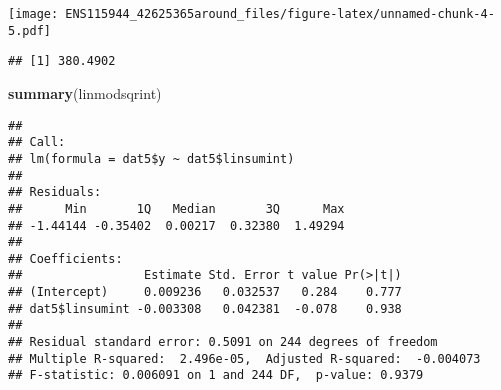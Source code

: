 \documentclass[
]{article}
\newenvironment{Shaded}{\begin{snugshade}}{\end{snugshade}}
\newcommand{\CommentTok}[1]{\textcolor[rgb]{0.56,0.35,0.01}{\textit{#1}}}
\newcommand{\DecValTok}[1]{\textcolor[rgb]{0.00,0.00,0.81}{#1}}
\newcommand{\FloatTok}[1]{\textcolor[rgb]{0.00,0.00,0.81}{#1}}
\newcommand{\KeywordTok}[1]{\textcolor[rgb]{0.13,0.29,0.53}{\textbf{#1}}}
\newcommand{\NormalTok}[1]{#1}
\newcommand{\OperatorTok}[1]{\textcolor[rgb]{0.81,0.36,0.00}{\textbf{#1}}}
\newcommand{\StringTok}[1]{\textcolor[rgb]{0.31,0.60,0.02}{#1}}
\begin{document}
\begin{Shaded}
\end{Shaded}

\texttt{[image: ENS115944\_42625365around\_files/figure-latex/unnamed-chunk-4-5.pdf]}

\begin{Shaded}
\end{Shaded}

\begin{verbatim}
## [1] 380.4902
\end{verbatim}

\begin{Shaded}
\begin{Highlighting}[]
\KeywordTok{summary}\NormalTok{(linmodsqrint)}
\end{Highlighting}
\end{Shaded}

\begin{verbatim}
## 
## Call:
## lm(formula = dat5$y ~ dat5$linsumint)
## 
## Residuals:
##      Min       1Q   Median       3Q      Max 
## -1.44144 -0.35402  0.00217  0.32380  1.49294 
## 
## Coefficients:
##                 Estimate Std. Error t value Pr(>|t|)
## (Intercept)     0.009236   0.032537   0.284    0.777
## dat5$linsumint -0.003308   0.042381  -0.078    0.938
## 
## Residual standard error: 0.5091 on 244 degrees of freedom
## Multiple R-squared:  2.496e-05,  Adjusted R-squared:  -0.004073 
## F-statistic: 0.006091 on 1 and 244 DF,  p-value: 0.9379
\end{verbatim}
\end{document}
